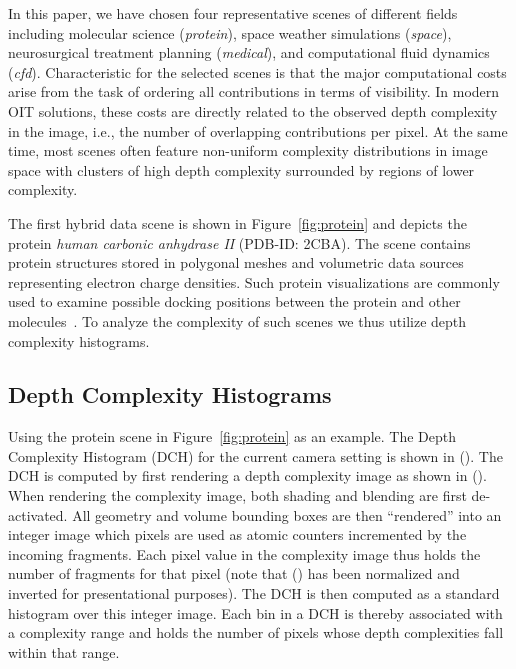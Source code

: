 \documentclass{egpubl}
\newcommand{\dch}{DCH}
\begin{document}
In this paper, we have chosen four representative scenes of different fields including molecular science (\emph{protein}), space weather simulations (\emph{space}), neurosurgical treatment planning (\emph{medical}), and computational fluid dynamics (\emph{cfd}). 
Characteristic for the selected scenes is that the major computational costs arise from the task of ordering all contributions in terms of visibility. 
In modern OIT solutions, these costs are directly related to the observed depth complexity in the image, i.e., the number of overlapping contributions per pixel. 
At the same time, most scenes often feature non-uniform complexity distributions in image space with clusters of high depth complexity surrounded by regions of lower complexity. 

%
The first hybrid data scene is shown in Figure~\ref{fig:protein} and depicts the protein \emph{human carbonic anhydrase II} (PDB-ID: 2CBA). 
The scene contains protein structures stored in polygonal meshes and volumetric data sources representing electron charge densities. 
Such protein visualizations are commonly used to examine possible docking positions between the protein and other molecules~\cite{Seeliger2010}. 
%
To analyze the complexity of such scenes we thus utilize depth complexity histograms.


\subsection{Depth Complexity Histograms}
\label{sec:dch}
   

Using the protein scene in Figure~\ref{fig:protein} as an example. 
The Depth Complexity Histogram (\dch) for the current camera setting is shown in (). 
The \dch{} is computed by first rendering a depth complexity image as shown in (). 
When rendering the complexity image, both shading and blending are first de-activated. 
All geometry and volume bounding boxes are then ``rendered'' into an integer image which pixels are used as atomic counters incremented by the incoming fragments. 
Each pixel value in the complexity image thus holds the number of fragments for that pixel (note that () has been normalized and inverted for presentational purposes).  
The \dch{} is then computed as a standard histogram over this integer image. 
Each bin in a \dch{} is thereby associated with a complexity range and holds the number of pixels whose depth complexities fall within that range. 
\end{document}
